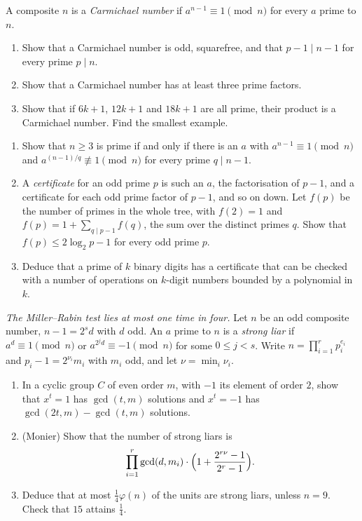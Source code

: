 \begin{exercise}[$\star\star$]\label{pb:carmichael}
A composite $n$ is a \emph{Carmichael number} if $a^{n-1}\equiv1\pmod n$ for every $a$ prime to $n$.
\begin{enumerate}[label=(\alph*)]
\item Show that a Carmichael number is odd, squarefree, and that $p-1\mid n-1$ for every prime $p\mid n$.
\item Show that a Carmichael number has at least three prime factors.
\item Show that if $6k+1$, $12k+1$ and $18k+1$ are all prime, their product is a Carmichael number. Find the smallest
example.
\end{enumerate}
\end{exercise}

\begin{exercise}[$\star\star$]\label{pb:pratt}
\begin{enumerate}[label=(\alph*)]
\item Show that $n\ge3$ is prime if and only if there is an $a$ with $a^{n-1}\equiv1\pmod n$ and $a^{(n-1)/q}\not\equiv1\pmod n$
for every prime $q\mid n-1$.
\item A \emph{certificate} for an odd prime $p$ is such an $a$, the factorisation of $p-1$, and a certificate for each odd
prime factor of $p-1$, and so on down. Let $f(p)$ be the number of primes in the whole tree, with $f(2)=1$ and
$f(p)=1+\sum_{q\mid p-1}f(q)$, the sum over the distinct primes $q$. Show that $f(p)\le2\log_2p-1$ for every odd prime $p$.
\item Deduce that a prime of $k$ binary digits has a certificate that can be checked with a number of operations on
$k$-digit numbers bounded by a polynomial in $k$.
\end{enumerate}
\end{exercise}

\begin{exercise}[Journey]\label{pb:rabin}
\emph{The Miller--Rabin test lies at most one time in four.} Let $n$ be an odd composite number, $n-1=2^sd$ with $d$ odd.
An $a$ prime to $n$ is a \emph{strong liar} if $a^d\equiv1\pmod n$ or $a^{2^jd}\equiv-1\pmod n$ for some $0\le j<s$. Write
$n=\prod_{i=1}^rp_i^{e_i}$ and $p_i-1=2^{\nu_i}m_i$ with $m_i$ odd, and let $\nu=\min_i\nu_i$.
\begin{enumerate}[label=(\alph*)]
\item In a cyclic group $C$ of even order $m$, with $-1$ its element of order $2$, show that $x^t=1$ has $\gcd(t,m)$
solutions and $x^t=-1$ has $\gcd(2t,m)-\gcd(t,m)$ solutions.
\item (Monier) Show that the number of strong liars is
\[
\prod_{i=1}^r\gcd(d,m_i)\cdot\Bigl(1+\frac{2^{r\nu}-1}{2^r-1}\Bigr).
\]
\item Deduce that at most $\frac14\varphi(n)$ of the units are strong liars, unless $n=9$. Check that $15$ attains $\frac14$.
\end{enumerate}
\end{exercise}

